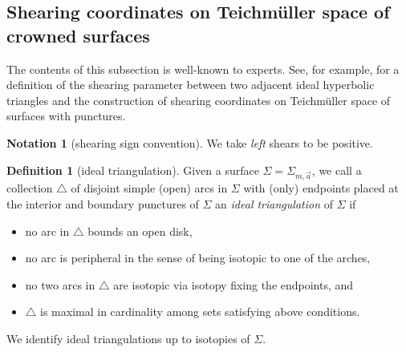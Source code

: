 \documentclass{amsart}
\theoremstyle{definition}
\newtheorem{definition}[proposition]{Definition}
\newtheorem{notation}[proposition]{Notation}
\begin{document}
 








\subsection{Shearing coordinates on Teichm\"uller space of crowned surfaces}
\label{subsec:shears}

The contents of this subsection is well-known to experts. See, for example, \cite[Section~7.4]{martelli2022introductiongeometrictopology} for a definition of the shearing parameter between two adjacent ideal hyperbolic triangles and the construction of shearing coordinates on Teichm\"uller space of surfaces with punctures.

\begin{notation}[shearing sign convention]
    We take \emph{left} shears to be positive.
\end{notation}

\begin{definition}[ideal triangulation]
Given a surface $\Sigma=\Sigma_{m,\vec{a}}$, we call a collection $\triangle$ of disjoint simple (open) arcs in $\Sigma$ with (only) endpoints placed at the interior and boundary punctures of $\Sigma$ an \emph{ideal triangulation} of $\Sigma$ if
\begin{itemize}
    \item no arc in $\triangle$ bounds an open disk, 
    \item no arc is peripheral in the sense of being isotopic to one of the arches,
    \item no two arcs in $\triangle$ are isotopic via isotopy fixing the endpoints, and
    \item $\triangle$ is maximal in cardinality among sets satisfying above conditions.
\end{itemize}
We identify ideal triangulations up to isotopies of $\Sigma$.  
\end{definition}
\end{document}
